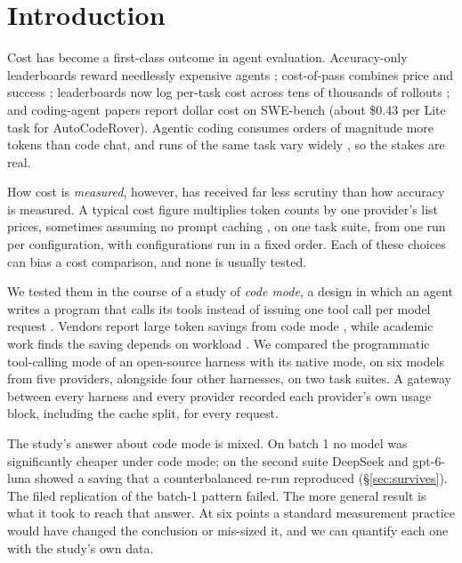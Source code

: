 \documentclass[10pt]{article}
\begin{document}
\section{Introduction}\label{sec:intro}

Cost has become a first-class outcome in agent evaluation. Accuracy-only leaderboards reward
needlessly expensive agents \citep{kapoor2024agents}; cost-of-pass combines price and success
\citep{erol2025costofpass}; leaderboards now log per-task cost across tens of thousands of rollouts
\citep{kapoor2025hal}; and coding-agent papers report dollar cost on SWE-bench
\citep{jimenez2024swebench,xia2024agentless,zhang2024autocoderover} (about \$0.43 per Lite task for AutoCodeRover). Agentic coding consumes orders of magnitude more
tokens than code chat, and runs of the same task vary widely \citep{bai2026agentspend}, so the stakes
are real.

How cost is \emph{measured}, however, has received far less scrutiny than how accuracy is measured.
A typical cost figure multiplies token counts by one provider's list prices, sometimes assuming no
prompt caching \citep{xu2024theagentcompany}, on one task suite, from one run per configuration, with
configurations run in a fixed order. Each of these choices can bias a cost comparison, and none is
usually tested.

We tested them in the course of a study of \emph{code mode}, a design in which an
agent writes a program that calls its tools instead of issuing one tool call per model request
\citep{wang2024codeact}. Vendors report large token savings from code mode
\citep{anthropic2025codeexecutionmcp,anthropic2025advancedtooluse,cloudflare2026codemode}, while
academic work finds the saving depends on workload \citep{patel2026bitterlesson}. We compared the
programmatic tool-calling mode of an open-source harness with its native mode, on six models from five
providers, alongside four other harnesses, on two task suites. A gateway between every harness and
every provider recorded each provider's own usage block, including the cache split, for every
request.

The study's answer about code mode is mixed. On batch 1 no model was significantly cheaper under
code mode; on the second suite DeepSeek and gpt-6-luna showed a saving that a counterbalanced re-run
reproduced (\S\ref{sec:survives}). The filed replication of the batch-1 pattern failed. The more general result
is what it took to reach that answer. At six points a standard measurement practice would have
changed the conclusion or mis-sized it, and we can quantify each one with the study's own data.
\end{document}
